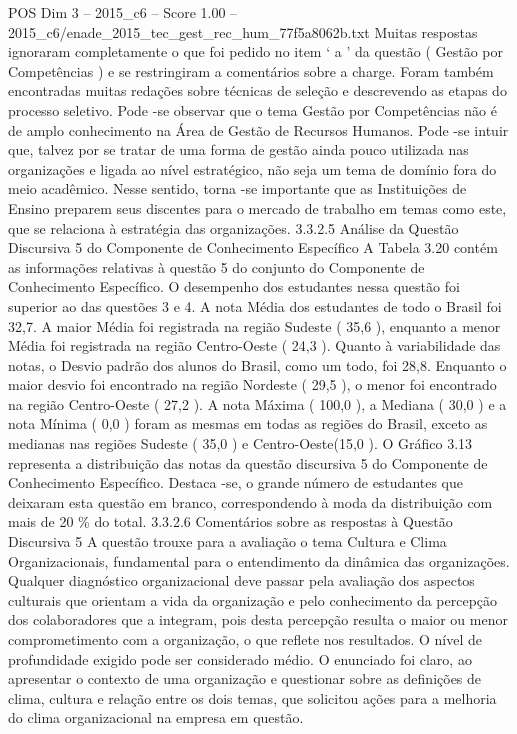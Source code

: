 \begin{textsample}{POS Dim 3 – 2015\_c6 – Score 1.00 – 2015\_c6/enade\_2015\_tec\_gest\_rec\_hum\_77f5a8062b.txt}
Muitas respostas ignoraram completamente o que foi pedido no item ‘ a ’ da questão ( Gestão por Competências ) e se restringiram a comentários sobre a charge.
Foram também encontradas muitas redações sobre técnicas de seleção e descrevendo as etapas do processo seletivo.
Pode -se observar que o tema Gestão por Competências não é de amplo conhecimento na Área de Gestão de Recursos Humanos.
Pode -se intuir que, talvez por se tratar de uma forma de gestão ainda pouco utilizada nas organizações e ligada ao nível estratégico, não seja um tema de domínio fora do meio acadêmico.
Nesse sentido, torna -se importante que as Instituições de Ensino preparem seus discentes para o mercado de trabalho em temas como este, que se relaciona à estratégia das organizações. 3.3.2.5 Análise da Questão Discursiva 5 do Componente de Conhecimento Específico A Tabela 3.20 contém as informações relativas à questão 5 do conjunto do Componente de Conhecimento Específico.
O desempenho dos estudantes nessa questão foi superior ao das questões 3 e 4.
A nota Média dos estudantes de todo o Brasil foi 32,7.
A maior Média foi registrada na região Sudeste ( 35,6 ), enquanto a menor Média foi registrada na região Centro-Oeste ( 24,3 ).
Quanto à variabilidade das notas, o Desvio padrão dos alunos do Brasil, como um todo, foi 28,8.
Enquanto o maior desvio foi encontrado na região Nordeste ( 29,5 ), o menor foi encontrado na região Centro-Oeste ( 27,2 ).
A nota Máxima ( 100,0 ), a Mediana ( 30,0 ) e a nota Mínima ( 0,0 ) foram as mesmas em todas as regiões do Brasil, exceto as medianas nas regiões Sudeste ( 35,0 ) e Centro-Oeste(15,0 ).
O Gráfico 3.13 representa a distribuição das notas da questão discursiva 5 do Componente de Conhecimento Específico.
Destaca -se, o grande número de estudantes que deixaram esta questão em branco, correspondendo à moda da distribuição com mais de 20 \% do total. 3.3.2.6 Comentários sobre as respostas à Questão Discursiva 5 A questão trouxe para a avaliação o tema Cultura e Clima Organizacionais, fundamental para o entendimento da dinâmica das organizações.
Qualquer diagnóstico organizacional deve passar pela avaliação dos aspectos culturais que orientam a vida da organização e pelo conhecimento da percepção dos colaboradores que a integram, pois desta percepção resulta o maior ou menor comprometimento com a organização, o que reflete nos resultados.
O nível de profundidade exigido pode ser considerado médio.
O enunciado foi claro, ao apresentar o contexto de uma organização e questionar sobre as definições de clima, cultura e relação entre os dois temas, que solicitou ações para a melhoria do clima organizacional na empresa em questão.

\end{textsample}
